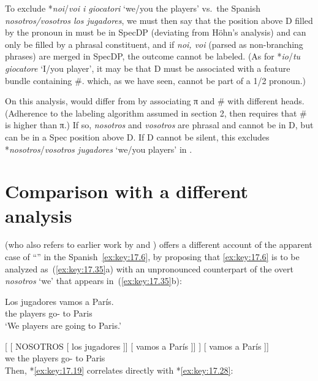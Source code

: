 \documentclass[output=paper]{langsci/langscibook}
\begin{document}
To exclude *\emph{noi}/\emph{voi i giocatori} ‘we/you the players’ vs.\ the
Spanish \emph{nosotros/vos\-otros los jugadores}, we must then say that
the position above D filled by the pronoun in  must be in SpecDP
(deviating from Höhn’s analysis) and can only be filled by a phrasal
constituent, and if \emph{noi, voi} (parsed as non-branching phrases) are
merged in SpecDP, the outcome cannot be labeled. (As for *\emph{io}/\emph{tu
giocatore} ‘I/you player’, it may be that D must be associated with a feature
bundle containing \#. which, as we have seen, cannot be part of a 1/2 \Sg{}
pronoun.)

On this analysis,  would differ from  by associating π and
\# with different heads. (Adherence to the labeling algorithm assumed in
section 2, then requires that \# is higher than π.) If so,
\emph{nosotros} and \emph{vosotros} are phrasal and cannot be in D, but can
be in a Spec position above D. If D cannot be silent, this excludes
*\emph{nosotros}/\emph{vosotros jugadores} ‘we/you players’ in .

\section{Comparison with a different analysis}\label{sec:key:17.7}

\textcite{Hoehn2016} (who also refers to earlier work by \citealt{Hurtado1985}
and \citealt{AckemaNeeleman2013}) offers a different account of the apparent
case of “” in the Spanish~\eqref{ex:key:17.6}, by proposing that
\eqref{ex:key:17.6} is to be analyzed as~(\ref{ex:key:17.35}a) with an unpronounced
counterpart of the overt \emph{nosotros} ‘we’ that appears
in~(\ref{ex:key:17.35}b):

\begin{exe}
\exi{\eqref{ex:key:17.6}}
    \gll    Los jugadores vamos a París.\\
            the players      go-\Fpl{} to Paris\\
    \glt    ‘We players are going to Paris.’
\end{exe}

\ea\label{ex:key:17.35}
    \ea {}[ [ NOSOTROS [ los jugadores ]] [ vamos a París ]]
    \ex
    \gll    [\tss{IP} [\tss{PersP} nosotros [\tss{DP} los jugadores ]] [ vamos a París ]]\\
            {} {} we {} the players {} go-\Fpl{} to Paris\\
    \z
\z
Then, *\eqref{ex:key:17.19} correlates directly with *\eqref{ex:key:17.28}:
\end{document}

